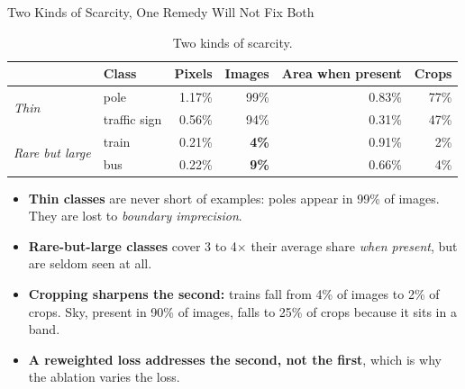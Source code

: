 \begin{frame}{Two Kinds of Scarcity, One Remedy Will Not Fix Both}
\small
\begin{table}
\centering
\caption{Two kinds of scarcity.}
\label{tab:scarcity}
\begin{tabular}{llrrrr}
\toprule
& \textbf{Class} & \textbf{Pixels} & \textbf{Images} & \textbf{Area when present} & \textbf{Crops} \\
\midrule
\multirow{2}{*}{\textit{Thin}} & pole         & 1.17\% & 99\% & 0.83\% & 77\% \\
                               & traffic sign & 0.56\% & 94\% & 0.31\% & 47\% \\
\midrule
\multirow{2}{*}{\textit{Rare but large}} & train & 0.21\% & \textbf{4\%} & 0.91\% & 2\% \\
                                         & bus   & 0.22\% & \textbf{9\%} & 0.66\% & 4\% \\
\bottomrule
\end{tabular}
\end{table}

\begin{itemize}
    \item \textbf{Thin classes} are never short of examples: poles appear in 99\% of images. They
          are lost to \emph{boundary imprecision}.
    \item \textbf{Rare-but-large classes} cover 3 to 4$\times$ their average share \emph{when
          present}, but are seldom seen at all.
    \item \textbf{Cropping sharpens the second:} trains fall from 4\% of images to 2\% of crops.
          Sky, present in 90\% of images, falls to 25\% of crops because it sits in a band.
    \item \textbf{A reweighted loss addresses the second, not the first}, which is why the
          ablation varies the loss.
\end{itemize}
\end{frame}


